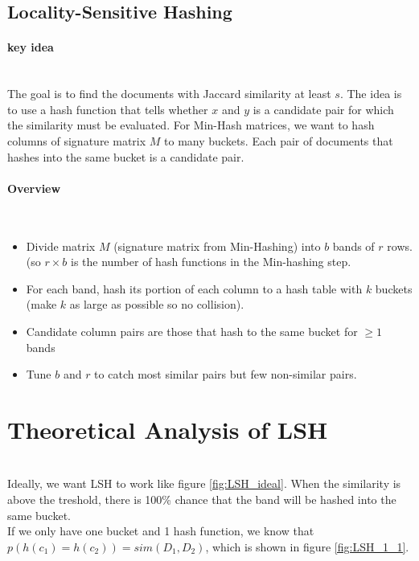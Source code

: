 \subsection{Locality-Sensitive Hashing}
\paragraph{key idea} \mbox{}\\
The goal is to find the documents with Jaccard similarity at least $s$. The idea is to use a hash function that tells whether $x$ and $y$ is a candidate pair for which the similarity must be evaluated. For Min-Hash matrices, we want to hash columns of signature matrix $M$ to many buckets. Each pair of documents that hashes into the same bucket is a candidate pair. 

\paragraph{Overview} \mbox{}\\
    \begin{itemize}
        \item Divide matrix $M$ (signature matrix from Min-Hashing) into $b$ bands of $r$ rows. (so $r \times b$ is the number of hash functions in the Min-hashing step. 
        \item For each band, hash its portion of each column to a hash table with $k$ buckets (make $k$ as large as possible so no collision). 
        \item Candidate column pairs are those that hash to the same bucket for $\geq 1$ bands
        \item Tune $b$ and $r$ to catch most similar pairs but few non-similar pairs. 
    \end{itemize}
    
\section{Theoretical Analysis of LSH} \mbox{}\\
Ideally, we want LSH to work like figure \ref{fig:LSH_ideal}. When the similarity is above the treshold, there is 100\% chance that the band will be hashed into the same bucket. \\

If we only have one bucket and 1 hash function, we know that $p(h(c_1) = h(c_2)) = sim(D_1, D_2)$, which is shown in figure \ref{fig:LSH_1_1}.

